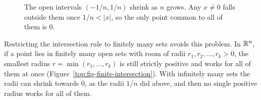 \begin{figure}[htbp]
\centering
{}
\caption{The open intervals $(-1/n, 1/n)$ shrink as $n$ grows. Any $x \neq 0$ falls outside them once $1/n < |x|$, so the only point common to all of them is $0$.}\label{top:fig-shrinking-intervals}
\end{figure}

Restricting the intersection rule to finitely many sets avoids this problem. In $\mathbb{R}^n$, if a point lies in finitely many open sets with room of radii $r_1, r_2, \dots, r_k > 0$, the smallest radius $r = \min(r_1, \dots, r_k)$ is still strictly positive and works for all of them at once (Figure~\ref{top:fig-finite-intersection}). With infinitely many sets the radii can shrink towards $0$, as the radii $1/n$ did above, and then no single positive radius works for all of them.

